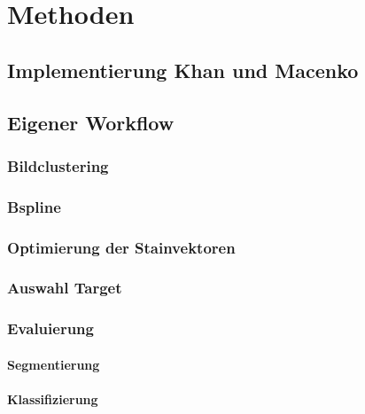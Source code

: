\chapter[Methoden]{Methoden}\label{sec:methoden}

\section{Implementierung Khan und Macenko}\label{sec:implementierung_khan_macenko}

\section{Eigener Workflow}\label{sec:eigener_workflow}
\subsection{Bildclustering}\label{sec:clustering}

\subsection{Bspline}\label{sec:bspline}

\subsection{Optimierung der Stainvektoren}

\subsection{Auswahl Target}\label{sec:auswahl_target}

\subsection{Evaluierung}\label{sec:evaluierung}
\subsubsection{Segmentierung}\label{sec:eval_segmentierung}
\subsubsection{Klassifizierung}\label{sec:eval_klassifizierung}

